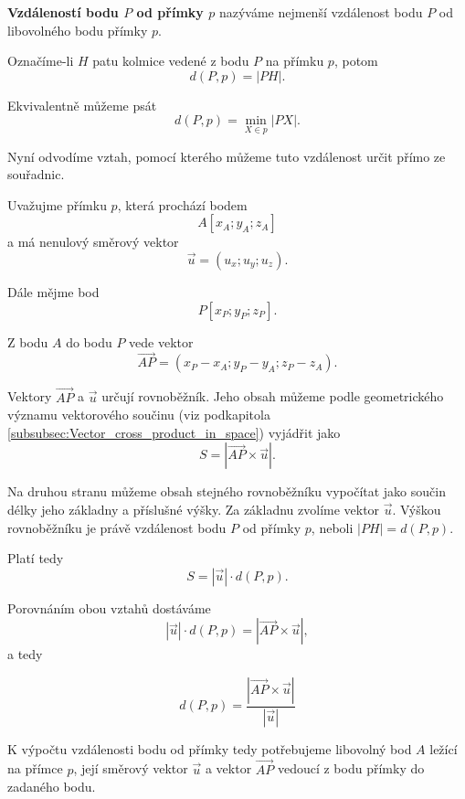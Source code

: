 \begin{definition}
    \label{def:Distance_point_line_space}
    \textbf{Vzdáleností bodu $P$ od přímky $p$} nazýváme nejmenší
    vzdálenost bodu $P$ od libovolného bodu přímky $p$.

    Označíme-li $H$ patu kolmice vedené z bodu $P$ na přímku $p$,
    potom
    \[
        d(P,p)=|PH|.
    \]

    Ekvivalentně můžeme psát
    \[
        d(P,p)
        =
        \min_{X\in p}|PX|.
    \]
\end{definition}

Nyní odvodíme vztah, pomocí kterého můžeme tuto vzdálenost určit
přímo ze souřadnic.

Uvažujme přímku $p$, která prochází bodem
\[
    A[x_A;y_A;z_A]
\]
a má nenulový směrový vektor
\[
    \vec{u}=(u_x;u_y;u_z).
\]

Dále mějme bod
\[
    P[x_P;y_P;z_P].
\]

Z bodu $A$ do bodu $P$ vede vektor
\[
    \overrightarrow{AP}
    =
    (x_P-x_A;y_P-y_A;z_P-z_A).
\]

Vektory $\overrightarrow{AP}$ a $\vec{u}$ určují rovnoběžník.
Jeho obsah můžeme podle geometrického významu vektorového součinu (viz podkapitola \ref{subsubsec:Vector_cross_product_in_space})
vyjádřit jako
\[
    S
    =
    \left|
        \overrightarrow{AP}\times\vec{u}
    \right|.
\]

Na druhou stranu můžeme obsah stejného rovnoběžníku vypočítat jako
součin délky jeho základny a příslušné výšky. Za základnu zvolíme
vektor $\vec{u}$. Výškou rovnoběžníku je právě vzdálenost bodu $P$
od přímky $p$, neboli $|PH|=d(P,p)$.

Platí tedy
\[
    S
    =
    |\vec{u}|\cdot d(P,p).
\]

Porovnáním obou vztahů dostáváme
\[
    |\vec{u}|\cdot d(P,p)
    =
    \left|
        \overrightarrow{AP}\times\vec{u}
    \right|,
\]
a tedy

\begin{equation}
        d(P,p)
        =
        \frac{
            \left|
                \overrightarrow{AP}\times\vec{u}
            \right|
        }{
            |\vec{u}|
        }
    \label{eq:Distance_point_line_space}
\end{equation}

K výpočtu vzdálenosti bodu od přímky tedy potřebujeme libovolný bod
$A$ ležící na přímce $p$, její směrový vektor $\vec{u}$ a vektor
$\overrightarrow{AP}$ vedoucí z bodu přímky do zadaného bodu.

